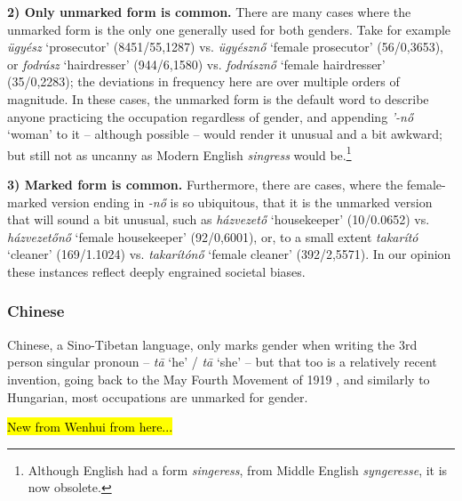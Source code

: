 \documentclass[11pt]{article}
\newcommand{\zh}[1]{\simplifiedchinesefont{#1}\rmfamily}
\begin{document}
\textbf{2) Only unmarked form is common.} There are many cases where the unmarked form is the only one generally used for both genders. Take for example \textit{ügyész} `prosecutor' (8451/55,1287) vs. \textit{ügyésznő} `female prosecutor' (56/0,3653), or \textit{fodrász} `hairdresser' (944/6,1580) vs. \textit{fodrásznő} `female hairdresser' (35/0,2283); the deviations in frequency here are over multiple orders of magnitude. In these cases, the unmarked form is the default word to describe anyone practicing the occupation regardless of gender, and appending \textit{'-nő} `woman' to it -- although possible -- would render it unusual and a bit awkward; but still not as uncanny as Modern English \textit{singress} would be.\footnote{Although English had a form \textit{singeress}, from Middle English \textit{syngeresse}, it is now obsolete.}

\textbf{3) Marked form is common.} Furthermore, there are cases, where the female-marked version ending in \textit{-nő} is so ubiquitous, that it is the unmarked version that will sound a bit unusual, such as \textit{házvezető} `housekeeper' (10/0.0652) vs. \textit{házvezetőnő} `female housekeeper' (92/0,6001), or, to a small extent \textit{takarító} `cleaner' (169/1.1024) vs. \textit{takarítónő} `female cleaner' (392/2,5571). In our opinion these instances reflect deeply engrained societal biases.

\subsubsection{Chinese}

Chinese, a Sino-Tibetan language, only marks gender when writing the 3rd person singular pronoun -- \zh{他} \textit{tā} `he' / \zh{她} \textit{tā} `she' -- but that too is a relatively recent invention, going back to the May Fourth Movement of 1919 \citep{bi_2013_tazi}, and similarly to Hungarian, most occupations are unmarked for gender.

\hl{New from Wenhui from here...}
\end{document}
